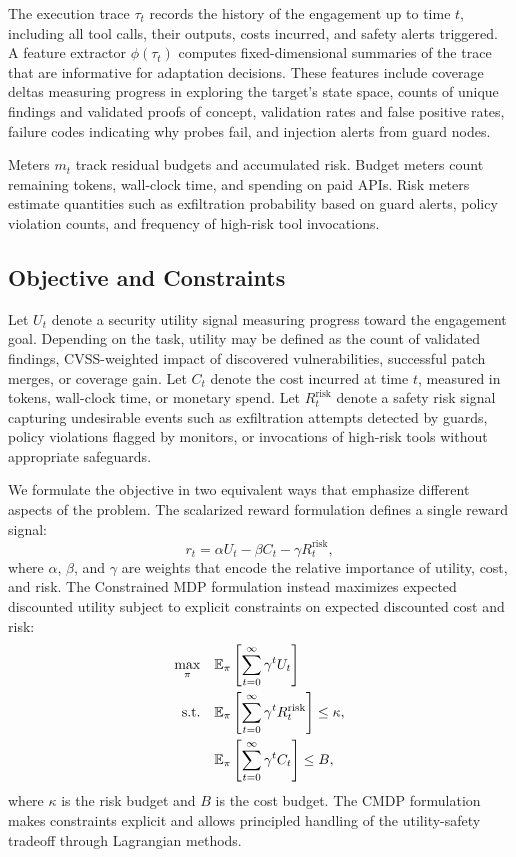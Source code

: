 \documentclass[sigconf,anonymous]{acmart}
\newcommand{\E}{\mathbb{E}}
\begin{document}
The execution trace $\tau_t$ records the history of the engagement up to time $t$, including all tool calls, their outputs, costs incurred, and safety alerts triggered. A feature extractor $\phi(\tau_t)$ computes fixed-dimensional summaries of the trace that are informative for adaptation decisions. These features include coverage deltas measuring progress in exploring the target's state space, counts of unique findings and validated proofs of concept, validation rates and false positive rates, failure codes indicating why probes fail, and injection alerts from guard nodes.

Meters $m_t$ track residual budgets and accumulated risk. Budget meters count remaining tokens, wall-clock time, and spending on paid APIs. Risk meters estimate quantities such as exfiltration probability based on guard alerts, policy violation counts, and frequency of high-risk tool invocations.

\subsection{Objective and Constraints}

Let $U_t$ denote a security utility signal measuring progress toward the engagement goal. Depending on the task, utility may be defined as the count of validated findings, CVSS-weighted impact of discovered vulnerabilities, successful patch merges, or coverage gain. Let $C_t$ denote the cost incurred at time $t$, measured in tokens, wall-clock time, or monetary spend. Let $R_t^{\text{risk}}$ denote a safety risk signal capturing undesirable events such as exfiltration attempts detected by guards, policy violations flagged by monitors, or invocations of high-risk tools without appropriate safeguards.

We formulate the objective in two equivalent ways that emphasize different aspects of the problem. The scalarized reward formulation defines a single reward signal:
\begin{equation}
\label{eq:scalarized}
r_t = \alpha U_t - \beta C_t - \gamma R_t^{\text{risk}},
\end{equation}
where $\alpha$, $\beta$, and $\gamma$ are weights that encode the relative importance of utility, cost, and risk. The Constrained MDP formulation instead maximizes expected discounted utility subject to explicit constraints on expected discounted cost and risk:
\begin{align}
\label{eq:cmdp}
\max_\pi \quad & \E_\pi\left[\sum_{t=0}^{\infty} \gamma^t U_t\right] \\
\text{s.t.} \quad & \E_\pi\left[\sum_{t=0}^{\infty} \gamma^t R_t^{\text{risk}}\right] \le \kappa, \notag \\
& \E_\pi\left[\sum_{t=0}^{\infty} \gamma^t C_t\right] \le B, \notag
\end{align}
where $\kappa$ is the risk budget and $B$ is the cost budget. The CMDP formulation makes constraints explicit and allows principled handling of the utility-safety tradeoff through Lagrangian methods.
\end{document}
